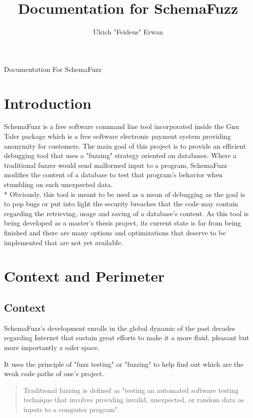 \documentclass{article}
\title{Documentation for SchemaFuzz}
\author{Ulrich "Feideus" Erwan}
\begin{document}
\begin{empfile}
	
\maketitle Documentation For SchemaFuzz
\clearpage

\tableofcontents


	\section{Introduction} 
	
SchemaFuzz is a free software command line tool incorporated inside the Gnu Taler package 
which is a free software electronic payment system providing anonymity for customers.
The main goal of this project is to provide an efficient debugging tool that uses a "fuzzing" strategy oriented on databases.  
Where a traditional fuzzer would send malformed input to a program, SchemaFuzz modifies the content of a database to test that program's behavior when stumbling on such unexpected data. \\*
Obviously, this tool is meant to be used as a mean of debugging as the goal is to pop bugs or put into light the security breaches that the code may contain regarding the retrieving, usage and saving of a database's content.
As this tool is being developed as a master's thesis project, its current state is far from being finished and there are many options and optimizations that deserve to be implemented that are not yet available.

	\clearpage

	
	\section{Context and Perimeter} 
		\subsection{Context}
SchemaFuzz's development enrolls in the global dynamic of the past decades regarding Internet  that sustain great efforts to make it a more fluid, pleasant but more importantly a safer space.

It uses the principle of "fuzz testing" or "fuzzing" to help find out which are the weak code paths of one's project. 
				\begin{quotation}
Traditional fuzzing is defined as "testing an automated software testing technique that involves providing invalid, unexpected, or random data as inputs to a computer program".
				\end{quotation}		


\end{empfile}
\end{document}
